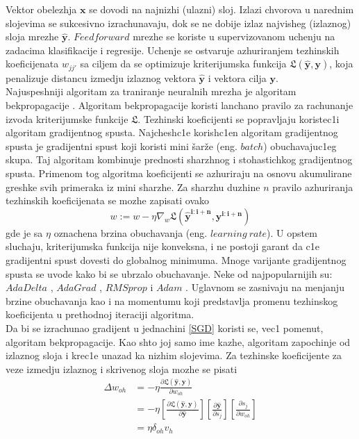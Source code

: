 \documentclass[a4paper, openany, oneside, 11pt]{book}
\begin{document}
Vektor obelezhja $\mathbf{x}$ se dovodi na najnizhi (ulazni) sloj. Izlazi chvorova u narednim slojevima se sukcesivno izrachunavaju, dok se ne dobije izlaz najvisheg (izlaznog) sloja mrezhe $\mathbf{\hat{y}}$. $Feedforward$ mrezhe se koriste u supervizovanom uchenju na zadacima klasifikacije i regresije. Uchenje se ostvaruje azhuriranjem tezhinskih koeficijenata $w_{jj'}$ sa ciljem da se optimizuje kriterijumska funkcija $\mathfrak{L}(\mathbf{\hat{y}}, \mathbf{y})$, koja penalizuje distancu izmedju izlaznog vektora $\mathbf{\hat{y}}$ i vektora cilja $\mathbf{y}$.\\
Najuspeshniji algoritam za traniranje neuralnih mrezha je algoritam bekpropagacije \cite{Backprog}. Algoritam bekpropagacije koristi lanchano pravilo za rachunanje izvoda kriterijumske funkcije $\mathfrak{L}$. Tezhinski koeficijenti se popravljaju koristec1i algoritam gradijentnog spusta. Najchesh\-c1e korish\-c1en algoritam gradijentnog spusta je gradijentni spust koji koristi mini šarže (eng. $batch$) obuchavajuc1eg skupa. Taj algoritam kombinuje prednosti sharzhnog i stohastichkog gradijentnog spusta. Primenom tog algoritma koeficijenti se azhuriraju na osnovu akumulirane greshke svih primeraka iz mini sharzhe. Za sharzhu duzhine $n$ pravilo azhuriranja tezhinskih koeficijenata se mozhe zapisati ovako
\begin{equation}\label{SGD}
w := w- \eta\nabla_w\mathfrak{L}\left(\mathbf{\hat{y}^{i:i+n}}, \mathbf{y^{i:i+n}}\right)
\end{equation}
gde je sa $\eta$ oznachena brzina obuchavanja (eng. $learning\ rate$).
U opstem sluchaju, kriterijumska funkcija nije konveksna, i ne postoji garant da c1e gradijentni spust dovesti do globalnog minimuma. Mnoge varijante gradijentnog spusta se uvode kako bi se ubrzalo obuchavanje. Neke od najpopularnijih su: $AdaDelta$ \cite{AdaDelta}, $AdaGrad$ \cite{AdaGrad}, $RMSprop$ \cite{RMSprop} i $Adam$ \cite{Adam}. Uglavnom se zasnivaju na menjanju brzine obuchavanja kao i na momentumu koji predstavlja promenu tezhinskog koeficijenta u prethodnoj iteraciji algoritma.\\
Da bi se izrachunao gradijent u jednachini \ref{SGD} koristi se, vec1 pomenut, algoritam bekpropagacije. Kao shto joj samo ime kazhe, algoritam zapochinje od izlaznog sloja i krec1e unazad ka nizhim slojevima. Za tezhinske koeficijente za veze izmedju izlaznog i skrivenog sloja mozhe se pisati
\begin{align}
\Delta w_{oh} &= -\eta\frac{\partial \mathfrak{L}\left(\mathbf{\hat{y}}, \mathbf{y}\right)}{\partial w_{oh}}\\
&=-\eta\left[\frac{\partial \mathfrak{L}\left(\mathbf{\hat{y}}, \mathbf{y}\right)}{\partial \mathbf{\hat{y}}}\right]\left[\frac{\partial \mathbf{\hat{y}}}{\partial s_j}\right]\left[\frac{\partial s_j}{\partial w_{oh}}\right]\\
&=\eta \delta_{oh}v_h
\end{align}
\end{document}
